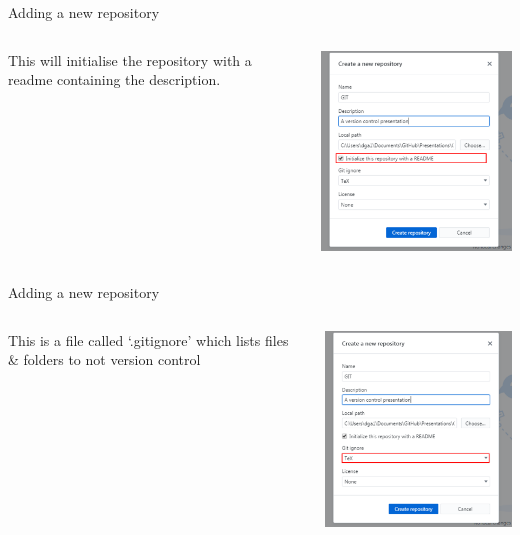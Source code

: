 \documentclass[10pt]{beamer}
\begin{document}
{\begin{frame}[fragile]{Adding a new repository}
\begin{columns}[T]
\begin{column}{.2\textwidth}
\small This will initialise the repository with a readme containing the description.
\end{column}
\begin{column}{.8\textwidth}
\includegraphics[width=8cm]{Figs/GHD/new_repo_04}
\end{column}
\end{columns}
\end{frame}

\begin{frame}[fragile]{Adding a new repository}
\begin{columns}[T]
\begin{column}{.2\textwidth}
\small This is a file called `.gitignore' which lists files \& folders to not version control
\end{column}
\begin{column}{.8\textwidth}
\includegraphics[width=8cm]{Figs/GHD/new_repo_05}
\end{column}
\end{columns}
\end{frame}


}
\end{document}
